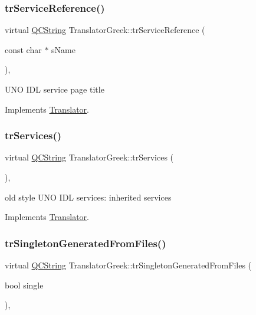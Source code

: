 \subsubsection{\texorpdfstring{trServiceReference()}{trServiceReference()}}
{\footnotesize\ttfamily virtual \mbox{\hyperlink{class_q_c_string}{Q\+C\+String}} Translator\+Greek\+::tr\+Service\+Reference (\begin{DoxyParamCaption}\item[{const char $\ast$}]{s\+Name }\end{DoxyParamCaption})\hspace{0.3cm}{\ttfamily [inline]}, {\ttfamily [virtual]}}

U\+NO I\+DL service page title 

Implements \mbox{\hyperlink{class_translator}{Translator}}.

\mbox{\label{class_translator_greek_a0b33a7139d6831f9592a05dbe8263558}} 
\subsubsection{\texorpdfstring{trServices()}{trServices()}}
{\footnotesize\ttfamily virtual \mbox{\hyperlink{class_q_c_string}{Q\+C\+String}} Translator\+Greek\+::tr\+Services (\begin{DoxyParamCaption}{ }\end{DoxyParamCaption})\hspace{0.3cm}{\ttfamily [inline]}, {\ttfamily [virtual]}}

old style U\+NO I\+DL services\+: inherited services 

Implements \mbox{\hyperlink{class_translator}{Translator}}.

\mbox{\label{class_translator_greek_a713979e553e9d66e16358246c6be4206}} 
\subsubsection{\texorpdfstring{trSingletonGeneratedFromFiles()}{trSingletonGeneratedFromFiles()}}
{\footnotesize\ttfamily virtual \mbox{\hyperlink{class_q_c_string}{Q\+C\+String}} Translator\+Greek\+::tr\+Singleton\+Generated\+From\+Files (\begin{DoxyParamCaption}\item[{bool}]{single }\end{DoxyParamCaption})\hspace{0.3cm}{\ttfamily [inline]}, {\ttfamily [virtual]}}

